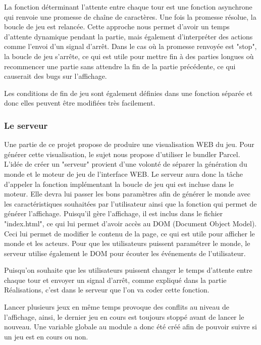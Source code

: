 \documentclass[french]{article}
\begin{document}
La fonction déterminant l'attente entre chaque tour est une fonction asynchrone qui renvoie une promesse de chaîne de caractères. Une fois la promesse résolue, la boucle de jeu est relancée.
Cette approche nous permet d'avoir un temps d'attente dynamique pendant la partie, mais également d'interpréter des actions comme l'envoi d'un signal d'arrêt. Dans le cas où la promesse renvoyée est "stop", la boucle de jeu s'arrête, ce qui est utile pour mettre fin à des parties longues où recommencer une partie sans attendre la fin de la partie précédente, ce qui causerait des bugs sur l'affichage.

Les conditions de fin de jeu sont également définies dans une fonction séparée et donc elles peuvent être modifiées très facilement.

\subsubsection{Le serveur}

Une partie de ce projet propose de produire une visualisation WEB du jeu.
Pour générer cette visualisation, le sujet nous propose d'utiliser le bundler Parcel.
L'idée de créer un "serveur" provient d'une volonté de séparer la génération du monde et le moteur de jeu de l'interface WEB.
Le serveur aura donc la tâche d'appeler la fonction implémentant la boucle de jeu qui est incluse dans le moteur. 
Elle devra lui passer les bons paramètres afin de générer le monde avec les caractéristiques souhaitées par l'utilisateur ainsi que la fonction qui permet de générer l'affichage.
Puisqu'il gère l'affichage, il est inclus dans le fichier "index.html", ce qui lui permet d'avoir accès au DOM (Document Object Model).
Ceci lui permet de modifier le contenu de la page, ce qui est utile pour afficher le monde et les acteurs.
Pour que les utilisateurs puissent paramétrer le monde, le serveur utilise également le DOM pour écouter les événements de l'utilisateur. 

Puisqu'on souhaite que les utilisateurs puissent changer le temps d'attente entre chaque tour et envoyer un signal d'arrêt, comme expliqué dans la partie Réalisations, c'est dans le serveur que l'on va coder cette fonction. 

Lancer plusieurs jeux en même temps provoque des conflits au niveau de l'affichage, ainsi, le dernier jeu en cours est toujours stoppé avant de lancer le nouveau.
Une variable globale au module a donc été créé afin de pouvoir suivre si un jeu est en cours ou non.
\end{document}
